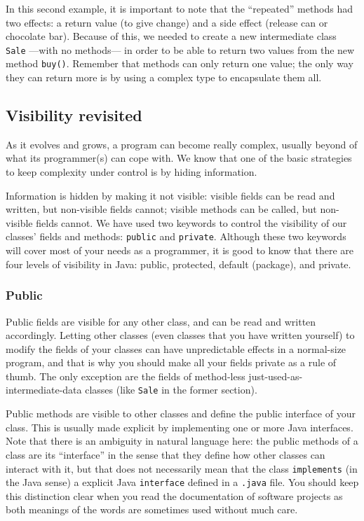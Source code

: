 In this second example, it is important to note
that the ``repeated'' methods had two effects: a return value
(to give change) and a side effect (release can or chocolate bar). Because of
this, we needed to create a new intermediate class \verb+Sale+ ---with
no methods--- in order to be able to return two values from the new
method \verb+buy()+. Remember that methods can only return one value;
the only way they can return more is by using a complex type to
encapsulate them all. 

\subsection{Visibility revisited}
\label{sec:protected-keyword}

As it evolves and grows, a program can become really complex, usually
beyond of what its programmer(s) can cope with. We know that one of
the basic strategies to keep complexity under control is by hiding
information. 

Information is hidden by making it not visible: visible fields can be
read and written, but non-visible fields cannot; visible methods can
be called, but non-visible fields cannot.  We have used two keywords
to control the visibility of our classes' fields and methods:
\verb+public+ and \verb+private+. Although these two keywords will
cover most of your needs as a programmer, it is good to know that
there are four levels of visibility in Java: public, protected,
default (package), and private.

\subsubsection{Public}
\label{sec:public}

Public fields are visible for any other class, and can be read and
written accordingly. Letting other classes (even classes that you have
written yourself) to modify
the fields of your classes can have unpredictable effects in a
normal-size program, and that is why you should make all your fields
private as a rule of thumb. The only exception are the fields of
method-less just-used-as-intermediate-data classes (like \verb+Sale+
in the former section). 

Public methods are visible to other classes and define the public
interface of your class. This is usually made explicit by implementing
one or more Java interfaces. Note that there is an ambiguity in
natural language here: the public methods of a class are its ``interface''
in the sense that they define how other classes can interact with it,
but that does not necessarily mean that the class \verb+implements+
(in the Java sense) a explicit Java \verb+interface+ defined in a
\verb+.java+ file. You should keep this distinction clear when you
read the documentation of software projects as both meanings of the
words are sometimes used without much care. 


